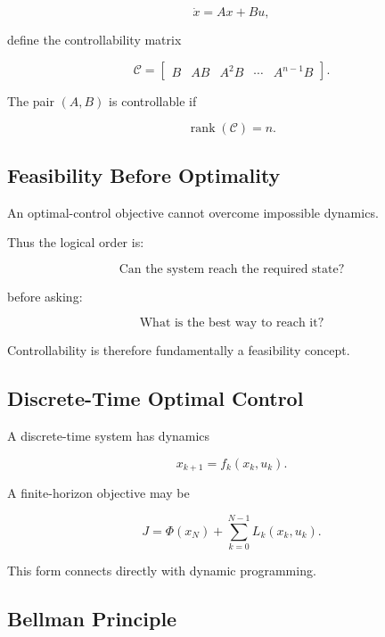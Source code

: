 \[
\dot{x}=Ax+Bu,
\]

define the controllability matrix

\[
\boxed{
\mathcal{C}
=
\begin{bmatrix}
B
&
AB
&
A^2B
&
\cdots
&
A^{n-1}B
\end{bmatrix}.
}
\]

The pair \((A,B)\) is controllable if

\[
\boxed{
\operatorname{rank}
(
\mathcal{C}
)
=
n.
}
\]

\subsection{Feasibility Before Optimality}
\label{subsec:feasibility-before-optimality}

An optimal-control objective cannot overcome impossible dynamics.

Thus the logical order is:

\[
\boxed{
\text{Can the system reach the required state?}
}
\]

before asking:

\[
\boxed{
\text{What is the best way to reach it?}
}
\]

Controllability is therefore fundamentally a feasibility concept.

\subsection{Discrete-Time Optimal Control}
\label{subsec:discrete-time-optimal-control}

A discrete-time system has dynamics

\[
\boxed{
x_{k+1}
=
f_k
(
x_k,
u_k
).
}
\]

A finite-horizon objective may be

\[
\boxed{
J
=
\Phi(x_N)
+
\sum_{k=0}^{N-1}
L_k
(
x_k,
u_k
).
}
\]

This form connects directly with dynamic programming.

\subsection{Bellman Principle}
\label{subsec:optimal-control-bellman-principle}

